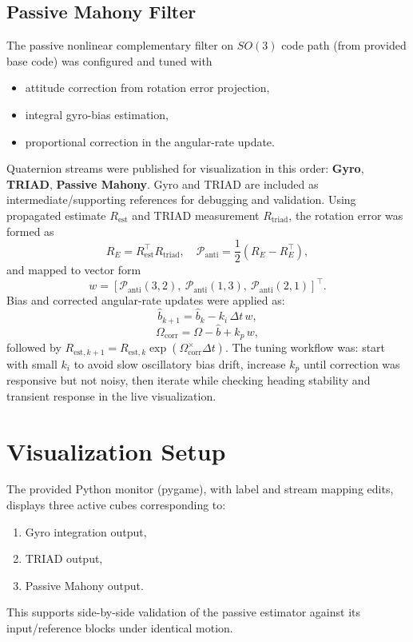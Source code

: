 \documentclass[12pt,a4paper]{article}
\begin{document}
\subsection{Passive Mahony Filter}
The passive nonlinear complementary filter on $SO(3)$ code path (from provided base code) was configured and tuned with
\begin{itemize}[leftmargin=1.5em]
    \item attitude correction from rotation error projection,
    \item integral gyro-bias estimation,
    \item proportional correction in the angular-rate update.
\end{itemize}
Quaternion streams were published for visualization in this order: \textbf{Gyro}, \textbf{TRIAD}, \textbf{Passive Mahony}. Gyro and TRIAD are included as intermediate/supporting references for debugging and validation.
Using propagated estimate $R_{\text{est}}$ and TRIAD measurement $R_{\text{triad}}$, the rotation error was formed as
\[
R_E = R_{\text{est}}^\top R_{\text{triad}}, \quad
\mathcal{P}_{\text{anti}} = \frac{1}{2}(R_E - R_E^\top),
\]
and mapped to vector form
\[
w = [\mathcal{P}_{\text{anti}}(3,2),\ \mathcal{P}_{\text{anti}}(1,3),\ \mathcal{P}_{\text{anti}}(2,1)]^\top.
\]
Bias and corrected angular-rate updates were applied as:
\[
\hat b_{k+1} = \hat b_k - k_i\,\Delta t\,w,
\]
\[
\Omega_{\text{corr}} = \Omega - \hat b + k_p\,w,
\]
followed by $R_{\text{est},k+1} = R_{\text{est},k}\exp(\Omega_{\text{corr}}^{\times}\Delta t)$.
The tuning workflow was: start with small $k_i$ to avoid slow oscillatory bias drift, increase $k_p$ until correction was responsive but not noisy, then iterate while checking heading stability and transient response in the live visualization.

\section{Visualization Setup}
The provided Python monitor (pygame), with label and stream mapping edits, displays three active cubes corresponding to:
\begin{enumerate}[leftmargin=1.5em]
    \item Gyro integration output,
    \item TRIAD output,
    \item Passive Mahony output.
\end{enumerate}
This supports side-by-side validation of the passive estimator against its input/reference blocks under identical motion.
\end{document}
